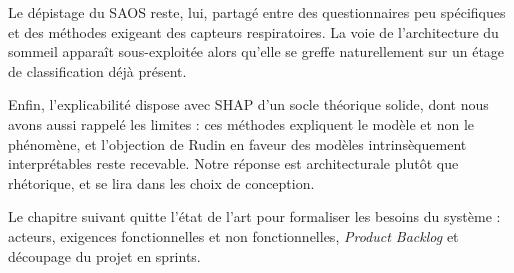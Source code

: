 Le dépistage du SAOS reste, lui, partagé entre des questionnaires peu spécifiques et
des méthodes exigeant des capteurs respiratoires. La voie de l'architecture du sommeil
apparaît sous-exploitée alors qu'elle se greffe naturellement sur un étage de
classification déjà présent.

Enfin, l'explicabilité dispose avec SHAP d'un socle théorique solide, dont nous avons
aussi rappelé les limites : ces méthodes expliquent le modèle et non le phénomène, et
l'objection de Rudin en faveur des modèles intrinsèquement interprétables reste
recevable. Notre réponse est architecturale plutôt que rhétorique, et se lira dans les
choix de conception.

Le chapitre suivant quitte l'état de l'art pour formaliser les besoins du système :
acteurs, exigences fonctionnelles et non fonctionnelles, \emph{Product Backlog} et
découpage du projet en sprints.
